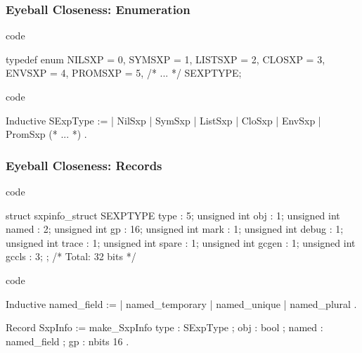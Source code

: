 \documentclass{beamer}
\begin{document}
\begin{frame}[fragile]
    \frametitle{Eyeball Closeness: Enumeration}

    \begin{minipage}{.45\textwidth}
        \Cn{} code

\begin{ccode}
typedef enum {
    NILSXP  = 0,
    SYMSXP  = 1,
    LISTSXP = 2,
    CLOSXP  = 3,
    ENVSXP  = 4,
    PROMSXP = 5,
    /* ... */
} SEXPTYPE;
\end{ccode}

    \end{minipage}
    \qquad
    \begin{minipage}{.45\textwidth}
        \Coq{} code

\begin{coqcode}
Inductive SExpType :=
  | NilSxp
  | SymSxp
  | ListSxp
  | CloSxp
  | EnvSxp
  | PromSxp
  (* ... *)
  .
\end{coqcode}

    \end{minipage}


\end{frame}

\begin{frame}[fragile]
    \frametitle{Eyeball Closeness: Records}

    \begin{minipage}{.45\textwidth}
        \Cn{} code

\begin{ccode}
struct sxpinfo_struct {
  SEXPTYPE type      :  5;
  unsigned int obj   :  1;
  unsigned int named :  2;
  unsigned int gp    : 16;
  unsigned int mark  :  1;
  unsigned int debug :  1;
  unsigned int trace :  1;
  unsigned int spare :  1;
  unsigned int gcgen :  1;
  unsigned int gccls :  3;
};
/* Total: 32 bits */
\end{ccode}

    \end{minipage}
    \qquad
    \begin{minipage}{.45\textwidth}
        \Coq{} code

\begin{coqcode}
Inductive named_field :=
  | named_temporary
  | named_unique
  | named_plural
  .

Record SxpInfo :=
  make_SxpInfo {
    type : SExpType ;
    obj : bool ;
    named : named_field ;
    gp : nbits 16
  }.
\end{coqcode}

    \end{minipage}


\end{frame}
\end{document}
